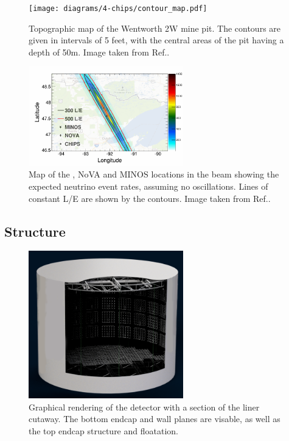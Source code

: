 \begin{figure} %
    \texttt{[image: diagrams/4-chips/contour\_map.pdf]}
    \caption[Topographic map of the Wentworth 2W mine pit.]
    {Topographic map of the Wentworth 2W mine pit. The contours are given in intervals of 5 feet,
        with the central areas of the pit having a depth of 50m. Image taken from
        Ref.\cite{adamson2013}.}
    \label{fig:contour_map}
\end{figure}

\begin{figure} %
    \includegraphics[width=0.6\textwidth]{diagrams/4-chips/numi_map.png}
    \caption[Map of detector locations in the \numi beam.]
    {Map of the \chips, NoVA and MINOS locations in the \numi beam showing the expected
        neutrino event rates, assuming no oscillations. Lines of constant L/E are shown by the
        contours. Image taken from Ref.\cite{adamson2013}.}
    \label{fig:numi_map}
\end{figure}

\subsection{Structure} %
\label{sec:chips_detector_structure} %

\begin{figure} %
    \includegraphics[width=0.6\textwidth]{diagrams/4-chips/chips_render_1.png}
    \caption[Graphical rendering of the \chipsfive detector with liner cutaway.]
    {Graphical rendering of the \chipsfive detector with a section of the liner cutaway.
        The bottom endcap and wall planes are visable,
        as well as the top endcap structure and floatation.}
    \label{fig:chips_render_1}
\end{figure}

